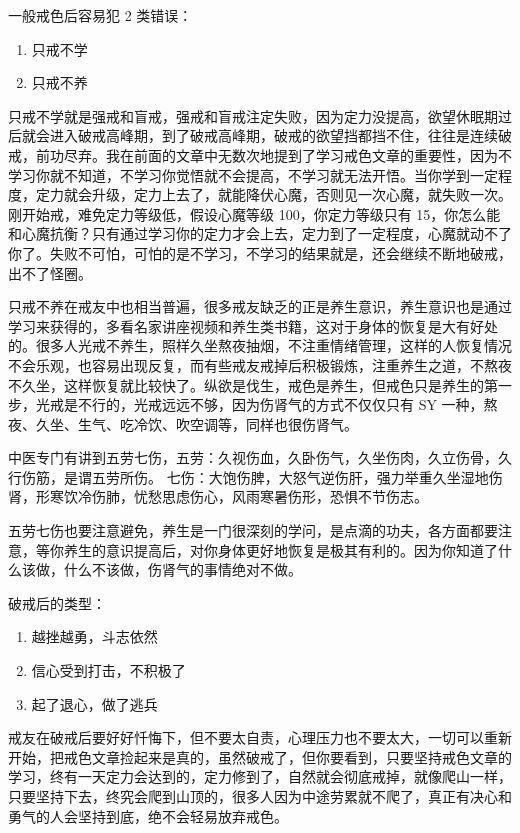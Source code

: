\documentclass{ctexart}
\begin{document}
一般戒色后容易犯 2 类错误：

\begin{enumerate}
    \item 只戒不学
    \item 只戒不养
\end{enumerate}

只戒不学就是强戒和盲戒，强戒和盲戒注定失败，因为定力没提高，欲望休眠期过后就会进入破戒高峰期，到了破戒高峰期，破戒的欲望挡都挡不住，往往是连续破戒，前功尽弃。我在前面的文章中无数次地提到了学习戒色文章的重要性，因为不学习你就不知道，不学习你觉悟就不会提高，不学习就无法开悟。当你学到一定程度，定力就会升级，定力上去了，就能降伏心魔，否则见一次心魔，就失败一次。刚开始戒，难免定力等级低，假设心魔等级 100，你定力等级只有 15，你怎么能和心魔抗衡？只有通过学习你的定力才会上去，定力到了一定程度，心魔就动不了你了。失败不可怕，可怕的是不学习，不学习的结果就是，还会继续不断地破戒，出不了怪圈。

只戒不养在戒友中也相当普遍，很多戒友缺乏的正是养生意识，养生意识也是通过学习来获得的，多看名家讲座视频和养生类书籍，这对于身体的恢复是大有好处的。很多人光戒不养生，照样久坐熬夜抽烟，不注重情绪管理，这样的人恢复情况不会乐观，也容易出现反复，而有些戒友戒掉后积极锻炼，注重养生之道，不熬夜不久坐，这样恢复就比较快了。纵欲是伐生，戒色是养生，但戒色只是养生的第一步，光戒是不行的，光戒远远不够，因为伤肾气的方式不仅仅只有 SY 一种，熬夜、久坐、生气、吃冷饮、吹空调等，同样也很伤肾气。

中医专门有讲到五劳七伤，五劳：久视伤血，久卧伤气，久坐伤肉，久立伤骨，久行伤筋，是谓五劳所伤。
七伤：大饱伤脾，大怒气逆伤肝，强力举重久坐湿地伤肾，形寒饮冷伤肺，忧愁思虑伤心，风雨寒暑伤形，恐惧不节伤志。

五劳七伤也要注意避免，养生是一门很深刻的学问，是点滴的功夫，各方面都要注意，等你养生的意识提高后，对你身体更好地恢复是极其有利的。因为你知道了什么该做，什么不该做，伤肾气的事情绝对不做。

破戒后的类型：

\begin{enumerate}
    \item 越挫越勇，斗志依然
    \item 信心受到打击，不积极了
    \item 起了退心，做了逃兵
\end{enumerate}

戒友在破戒后要好好忏悔下，但不要太自责，心理压力也不要太大，一切可以重新开始，把戒色文章捡起来是真的，虽然破戒了，但你要看到，只要坚持戒色文章的学习，终有一天定力会达到的，定力修到了，自然就会彻底戒掉，就像爬山一样，只要坚持下去，终究会爬到山顶的，很多人因为中途劳累就不爬了，真正有决心和勇气的人会坚持到底，绝不会轻易放弃戒色。
\end{document}
